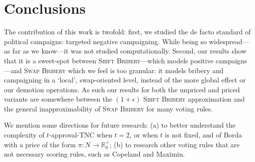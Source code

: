 \documentclass[letterpaper]{article} %
\newtheorem{corollary}{Corollary}
\newcommand{\preals}{\mathbb{R}^{+}_{0}}
\newcommand{\SB}{\textsc{TNC}}
\newcommand{\vcSB}{$\$_{v,c}$-\SB}
\newcommand{\swapB}{\textsc{Swap Bribery}}
\newcommand{\shiftB}{\textsc{Shift Bribery}}
\newcommand{\NP}{\mathrm{NP}}
\newcommand{\Pclass}{\mathrm{P}}
\begin{document}
\section{Conclusions}
The contribution of this work is twofold: first, we studied the de facto standard of political campaigns: targeted negative  campaigning. While being so widespread---as far as we know---it was not studied computationally. Second, our results show that it is a sweet-spot between \shiftB{}---which models positive campaigns---and \swapB{} which we feel is too granular: it models bribery and campaigning in a `local', swap-oriented level, instead of the more global effect or our demotion operations. As such our results for both the unpriced and priced variants are somewhere between the $(1+\epsilon)$ \shiftB{} approximation and the general inapproximability of \swapB{} for many voting rules.

We mention some directions for future research: (a) to better understand the complexity of  $t$-approval-\SB{} when $t=2$, or when $t$ is not fixed, and of Borda with a price  of the form $\pi\colon N \to \preals$; (b) to research other voting rules that are not necessary scoring rules, such as Copeland and Maximin.




\end{document}
